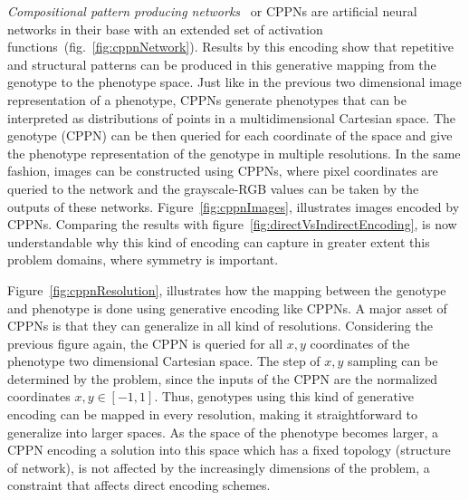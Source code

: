 \emph{Compositional pattern producing networks}~\cite{stanley2007compositional} or CPPNs are artificial neural networks in their base with an extended set of activation functions~(fig.~\ref{fig:cppnNetwork}). Results by this encoding show that repetitive and structural patterns can be produced in this generative mapping from the genotype to the phenotype space. Just like in the previous two dimensional image representation of a phenotype, CPPNs generate phenotypes that can be interpreted as distributions of points in a multidimensional Cartesian space. The genotype (CPPN) can be then queried for each coordinate of the space and give the phenotype representation of the genotype in multiple resolutions. In the same fashion, images can be constructed using CPPNs, where pixel coordinates are queried to the network and the grayscale-RGB values can be taken by the outputs of these networks. Figure~\ref{fig:cppnImages}, illustrates images encoded by CPPNs. Comparing the results with figure~\ref{fig:directVsIndirectEncoding}, is now understandable why this kind of encoding can capture in greater extent this problem domains, where symmetry is important.

Figure~\ref{fig:cppnResolution}, illustrates how the mapping between the genotype and phenotype is done using generative encoding like CPPNs. A major asset of CPPNs is that they can generalize in all kind of resolutions. Considering the previous figure again, the CPPN is queried for all $x,y$ coordinates of the phenotype two dimensional Cartesian space. The step of $x,y$ sampling can be determined by the problem, since the inputs of the CPPN are the normalized coordinates $x,y \in [-1,1]$. Thus, genotypes using this kind of generative encoding can be mapped in every resolution, making it straightforward to generalize into larger spaces. As the space of the phenotype becomes larger, a CPPN encoding a solution into this space which has a fixed topology (structure of network), is not affected by the increasingly dimensions of the problem, a constraint that affects direct encoding schemes.

